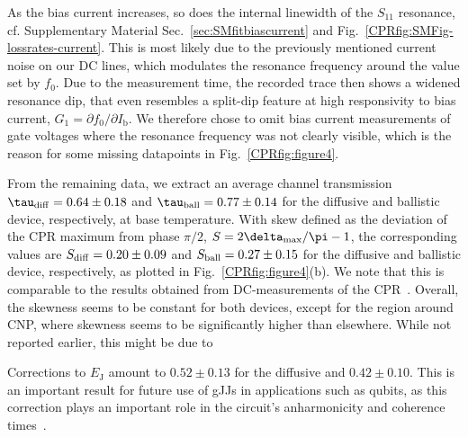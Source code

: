 As the bias current increases, so does the internal linewidth of the $S_{11}$ resonance, cf. Supplementary Material Sec.~\ref{sec:SMfitbiascurrent} and Fig.~\ref{CPRfig:SMFig-lossrates-current}.
%
This is most likely due to the previously mentioned current noise on our DC lines, which modulates the resonance frequency around the value set by $f_0$.
%
Due to the measurement time, the recorded trace then shows a widened resonance dip, that even resembles a split-dip feature at high responsivity to bias current, $G_1=\partial f_0/\partial I_\text{b}$.
%
We therefore chose to omit bias current measurements of gate voltages where the resonance frequency was not clearly visible, which is the reason for some missing datapoints in Fig.~\ref{CPRfig:figure4}.

From the remaining data, we extract an average channel transmission $\tau_{\rm diff}=0.64\pm0.18$ and $\tau_{\rm ball}=0.77\pm0.14$ for the diffusive and ballistic device, respectively, at base temperature.
%
With skew defined as the deviation of the CPR maximum from phase $\pi/2$, $S=2\delta_{\rm max}/\pi -1$, the corresponding values are $S_{\rm diff}=0.20\pm0.09$ and $S_{\rm ball}=0.27\pm0.15$ for the diffusive and ballistic device, respectively, as plotted in Fig.~\ref{CPRfig:figure4}(b).
%
We note that this is comparable to the results obtained from DC-measurements of the CPR~\cite{englishObservationNonsinusoidalCurrentphase2016,nandaCurrentPhaseRelationBallistic2017}.
%
Overall, the skewness seems to be constant for both devices, except for the region around CNP, where skewness seems to be significantly higher than elsewhere.
%
While not reported earlier, this might be due to 




Corrections to $E_\text{J}$ amount to $0.52\pm0.13$ for the diffusive and $0.42\pm0.10$.
%
This is an important result for future use of gJJs in applications such as qubits, as this correction plays an important role in the circuit's anharmonicity and coherence times~\cite{kringhojAnharmonicitySuperconductingQubit2018}.

